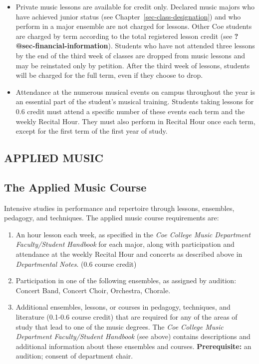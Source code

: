 \documentclass[
  letterpaper,
]{scrbook}
\providecommand{\tightlist}{%
  \setlength{\itemsep}{0pt}\setlength{\parskip}{0pt}}
\begin{document}
\begin{itemize}
\tightlist
\item
  Private music lessons are available for credit only. Declared music
  majors who have achieved junior status (see
  Chapter~\ref{sec-class-designation}) and who perform in a major
  ensemble are not charged for lessons. Other Coe students are charged
  by term according to the total registered lesson credit (see
  \textbf{?@sec-financial-information}). Students who have not attended
  three lessons by the end of the third week of classes are dropped from
  music lessons and may be reinstated only by petition. After the third
  week of lessons, students will be charged for the full term, even if
  they choose to drop.
\item
  Attendance at the numerous musical events on campus throughout the
  year is an essential part of the student's musical training. Students
  taking lessons for 0.6 credit must attend a specific number of these
  events each term and the weekly Recital Hour. They must also perform
  in Recital Hour once each term, except for the first term of the first
  year of study.
\end{itemize}

\subsection{APPLIED MUSIC}\label{applied-music}

\subsection{The Applied Music Course}\label{the-applied-music-course}

Intensive studies in performance and repertoire through lessons,
ensembles, pedagogy, and techniques. The applied music course
requirements are:

\begin{enumerate}
\def\labelenumi{\arabic{enumi}.}
\tightlist
\item
  An hour lesson each week, as specified in the \emph{Coe College Music
  Department Faculty/Student Handbook} for each major, along with
  participation and attendance at the weekly Recital Hour and concerts
  as described above in \emph{Departmental Notes}. (0.6 course credit)
\item
  Participation in one of the following ensembles, as assigned by
  audition: Concert Band, Concert Choir, Orchestra, Chorale.
\item
  Additional ensembles, lessons, or courses in pedagogy, techniques, and
  literature (0.1-0.6 course credit) that are required for any of the
  areas of study that lead to one of the music degrees. The \emph{Coe
  College Music Department Faculty/Student Handbook} (see above)
  contains descriptions and additional information about these ensembles
  and courses. \textbf{Prerequisite:} an audition; consent of department
  chair.
\end{enumerate}
\end{document}
